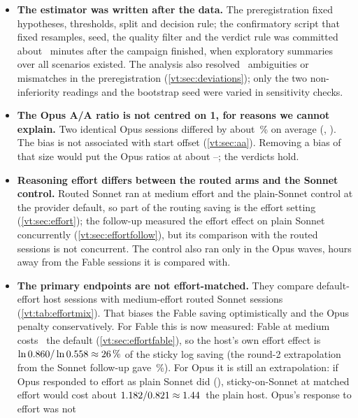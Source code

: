 \begin{itemize}
    preregistration commit, and re-extraction with the committed harness reproduces the rows byte for byte,
    but the exact runner code was not under version control while it ran.
  \item \textbf{The estimator was written after the data.} The preregistration fixed hypotheses, thresholds,
    split and decision rule; the confirmatory script that fixed resamples, seed, the quality filter and the
    verdict rule was committed about \ConfirmAfterMin\ minutes after the campaign finished, when exploratory
    summaries over all scenarios existed. The analysis also resolved \NDeviations\ ambiguities or mismatches
    in the preregistration (\cref{vt:sec:deviations}); only the two non-inferiority readings and the bootstrap
    seed were varied in sensitivity checks.
  \item \textbf{The Opus A/A ratio is not centred on 1, for reasons we cannot explain.} Two identical Opus
    sessions differed by about \AAOpusPct\,\% on average (\AAOpus, \AAOpusCI). The bias is not associated with
    start offset (\cref{vt:sec:aa}). Removing a bias of that size would put the Opus ratios at about
    \OpusAdjLow--\OpusAdjHigh; the verdicts hold.
  \item \textbf{Reasoning effort differs between the routed arms and the Sonnet control.} Routed Sonnet ran at
    medium effort and the plain-Sonnet control at the provider default, so part of the routing saving is the
    effort setting (\cref{vt:sec:effort}); the follow-up measured the effort effect on plain Sonnet concurrently
    (\cref{vt:sec:effortfollow}), but its comparison with the routed sessions is not concurrent. The control also ran only in the Opus waves, hours away from the Fable
    sessions it is compared with.
  \item \textbf{The primary endpoints are not effort-matched.} They compare default-effort host sessions with
    medium-effort routed Sonnet sessions (\cref{vt:tab:effortmix}). That biases the Fable saving optimistically and the Opus
    penalty conservatively. For Fable this is now measured: Fable at medium costs \EfRatio\X\ the default
    (\cref{vt:sec:effortfable}), so the host's own effort effect is $\ln 0.860 / \ln 0.558 \approx
    26\,\%$ of the sticky log saving (the round-2 extrapolation from the Sonnet follow-up gave
    \RgEffShareFable\,\%). For Opus it is still an extrapolation: if Opus responded to effort as plain Sonnet did
    (\EcRatio\X), sticky-on-Sonnet at matched effort would cost about
    $1.182 / 0.821 \approx 1.44$\X\ the plain host. Opus's response to effort was not

\end{itemize}
